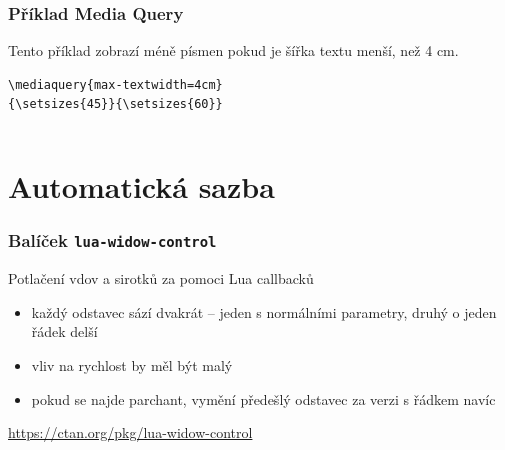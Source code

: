 \begin{frame}[fragile]

  \frametitle{Příklad Media Query}

  Tento příklad zobrazí méně písmen pokud je šířka textu menší, než 4 cm.

  
\begin{verbatim}
\mediaquery{max-textwidth=4cm}
{\setsizes{45}}{\setsizes{60}}
\end{verbatim}
\begin{columns}
  \begin{column}{0.5\textwidth}
\end{column}
  \begin{column}{0.5\textwidth}
\end{column}
\end{columns}

\end{frame}


\section{Automatická sazba}

\begin{frame}
  \frametitle{Balíček \texttt{lua-widow-control}}
  Potlačení vdov a sirotků za pomoci Lua callbacků
  \begin{itemize}
    \item každý odstavec sází dvakrát -- jeden s normálními parametry, druhý o jeden řádek delší
    \item vliv na rychlost by měl být malý
    
    \item pokud se najde parchant, vymění předešlý odstavec za verzi s řádkem navíc
  \end{itemize}
  \url{https://ctan.org/pkg/lua-widow-control}
\end{frame}

